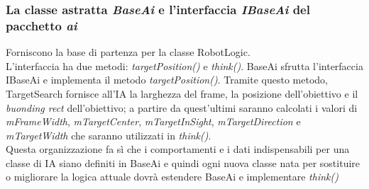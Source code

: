 \subsubsection{La classe astratta \emph{BaseAi} e l'interfaccia \emph{IBaseAi} del pacchetto \emph{ai}}
Forniscono la base di partenza per la classe RobotLogic.\\
L'interfaccia ha due metodi: \emph{targetPosition()} e \emph{think()}.
BaseAi sfrutta l'interfaccia IBaseAi e implementa il metodo \emph{targetPosition()}. 
Tramite questo metodo, TargetSearch fornisce all'IA la larghezza del frame, la posizione 
dell'obiettivo e il \emph{buonding rect} dell'obiettivo; a partire da quest'ultimi saranno 
calcolati i valori di \emph{mFrameWidth}, \emph{mTargetCenter}, \emph{mTargetInSight},
\emph{mTargetDirection} e \emph{mTargetWidth} che saranno utilizzati in \emph{think()}.\\
Questa organizzazione fa sì che i comportamenti e i dati indispensabili per una classe di 
IA siano definiti in BaseAi e quindi ogni nuova classe nata per sostituire o migliorare
la logica attuale dovrà estendere BaseAi e implementare \emph{think()} 

